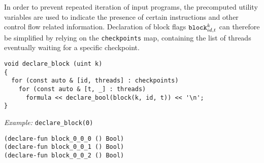 

\noindent
In order to prevent repeated iteration of input programs,
the precomputed utility variables are used to indicate the presence of certain instructions and other control flow related information.
Declaration of block flags $\texttt{block}^k_{id, t}$ can therefore be simplified by relying on the \texttt{checkpoints} map,
containing the list of threads eventually waiting for a specific checkpoint.

\begin{lstlisting}[style=c++]
void declare_block (uint k)
{
  for (const auto & [id, threads] : checkpoints)
    for (const auto & [t, _] : threads)
      formula << declare_bool(block(k, id, t)) << '\n';
}
\end{lstlisting}

\noindent
\emph{Example:} \lstinline[style=c++]{declare_block(0)}

\begin{lstlisting}[language=SMTLib]
(declare-fun block_0_0_0 () Bool)
(declare-fun block_0_0_1 () Bool)
(declare-fun block_0_0_2 () Bool)
\end{lstlisting}

